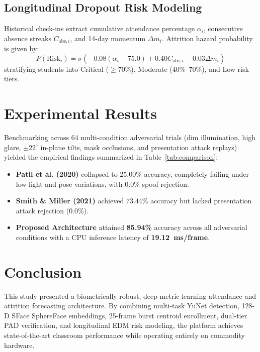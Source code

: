 \documentclass[journal,10pt,twocolumn]{IEEEtran}
\begin{document}
\subsection{Longitudinal Dropout Risk Modeling}
Historical check-ins extract cumulative attendance percentage $\alpha_i$, consecutive absence streaks $C_{\text{abs}, i}$, and 14-day momentum $\Delta m_i$. Attrition hazard probability is given by:
\begin{equation}
P(\text{Risk}_i) = \sigma\left( -0.08 (\alpha_i - 75.0) + 0.40 C_{\text{abs}, i} - 0.03 \Delta m_i \right)
\end{equation}
stratifying students into Critical ($\ge 70\%$), Moderate ($40\%$--$70\%$), and Low risk tiers.

\section{Experimental Results}
Benchmarking across 64 multi-condition adversarial trials (dim illumination, high glare, $\pm 22^\circ$ in-plane tilts, mask occlusions, and presentation attack replays) yielded the empirical findings summarized in Table~\ref{tab:comparison}:
\begin{itemize}
    \item \textbf{Patil et al. (2020)} collapsed to $25.00\%$ accuracy, completely failing under low-light and pose variations, with $0.0\%$ spoof rejection.
    \item \textbf{Smith \& Miller (2021)} achieved $73.44\%$ accuracy but lacked presentation attack rejection ($0.0\%$).
    \item \textbf{Proposed Architecture} attained \textbf{85.94\%} accuracy across all adversarial conditions with a CPU inference latency of \textbf{19.12~ms/frame}.
\end{itemize}

\section{Conclusion}
This study presented a biometrically robust, deep metric learning attendance and attrition forecasting architecture. By combining multi-task YuNet detection, 128-D SFace SphereFace embeddings, 25-frame burst centroid enrollment, dual-tier PAD verification, and longitudinal EDM risk modeling, the platform achieves state-of-the-art classroom performance while operating entirely on commodity hardware.
\end{document}
